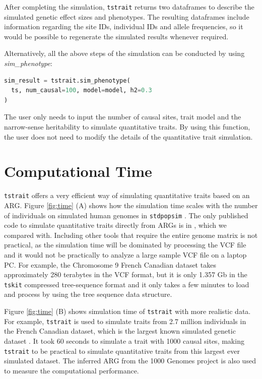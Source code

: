 \documentclass[unnumsec,webpdf,modern,large,namedate]{oup-authoring-template}%
\begin{document}
After completing the simulation, \texttt{tstrait} returns two dataframes to
describe the simulated genetic effect sizes and phenotypes. The resulting
dataframes include information regarding the site IDs, individual IDs and
allele frequencies, so it would be possible to regenerate the simulated results
whenever required.

Alternatively, all the above steps of the simulation can be conducted by using
\emph{sim\_phenotype}:
\begin{lstlisting}[language=Python]
sim_result = tstrait.sim_phenotype(
  ts, num_causal=100, model=model, h2=0.3
)
\end{lstlisting}
The user only needs to input the number of causal sites, trait model and the
narrow-sense heritability to simulate quantitative traits. By using this
function, the user does not need to modify the details of the quantitative
trait simulation.

\section{Computational Time}

\texttt{tstrait} offers a very efficient way of simulating quantitative traits
based on an ARG. Figure \ref{fig:time} (A) shows how the simulation time scales
with the number of individuals on simulated human genomes in \texttt{stdpopsim}
\citep{adrion2020}. The only published code to simulate quantitative traits
directly from ARGs is in \cite{martin2017}, which we compared with. Including
other tools that require the entire genome matrix is not practical, as the
simulation time will be dominated by processing the VCF file and it would not
be practically to analyze a large sample VCF file on a laptop PC. For example,
the Chromosome 9 French Canadian dataset takes approximately 280 terabytes in
the VCF format, but it is only 1.357 Gb in the \texttt{tskit} compressed
tree-sequence format and it only takes a few minutes to load and process by
using the tree sequence data structure.

Figure \ref{fig:time} (B) shows simulation time of \texttt{tstrait} with more
realistic data. For example, \texttt{tstrait} is used to simulate traits from
2.7 million individuals in the French Canadian dataset, which is the largest
known simulated genetic dataset \citep{anderson2023}. It took 60 seconds to
simulate a trait with 1000 causal sites, making \texttt{tstrait} to be
practical to simulate quantitative traits from this largest ever simulated
dataset. The inferred ARG from the 1000 Genomes project \citep{kelleher2019} is
also used to measure the computational performance.
\end{document}
